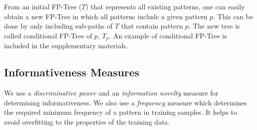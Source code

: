 From an initial FP-Tree ($T$) that represents all existing patterns, 
one can easily obtain a new FP-Tree in which all patterns include a given pattern $p$.
This can be done by only including sub-paths of $T$ that contain pattern $p$. 
The new tree is called conditional FP-Tree of $p$, $T_{p}$.
An example of conditional FP-Tree is included in the supplementary materials.
%
\iffalse
\begin{figure}[]
\begin{center}
 \resizebox{0.8\columnwidth}{!}{
\begin{tikzpicture}
\node [rectangle,draw]{ROOT} [level distance=8mm,sibling distance=25mm]
child { node [rectangle,draw]{anaphor-type=proper} [level distance=8mm ,sibling distance=42mm]
child {node [rectangle,draw] {head-match=T}  [level distance=8mm ,sibling distance=27mm]
}
child {node [rectangle,draw] {head-match=F}}
};
\end{tikzpicture}
}
\end{center}
\caption[The final FP-Tree with support values]{A sample FP-Tree.\label{fp-tree_example}}
\end{figure}
\fi
\subsection{Informativeness Measures}
\label{patternEval}
We use a \emph{discriminative power} and an \emph{information novelty} measure for determining informativeness.
We also use a \emph{frequency} measure which determines the required minimum frequency of a pattern in training samples.
It helps to avoid overfitting to the properties of the training data.

